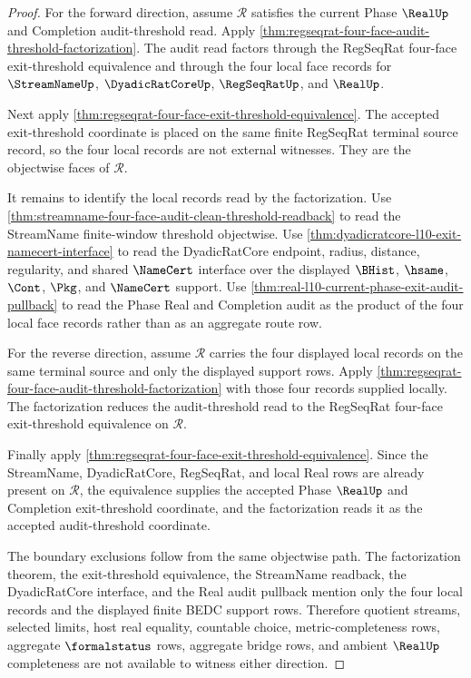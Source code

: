 \begin{proof}
For the forward direction, assume $\mathcal R$ satisfies the current Phase $\RealUp$ and Completion audit-threshold read. Apply \autoref{thm:regseqrat-four-face-audit-threshold-factorization}. The audit read factors through the RegSeqRat four-face exit-threshold equivalence and through the four local face records for $\StreamNameUp$, $\DyadicRatCoreUp$, $\RegSeqRatUp$, and $\RealUp$.

Next apply \autoref{thm:regseqrat-four-face-exit-threshold-equivalence}. The accepted exit-threshold coordinate is placed on the same finite RegSeqRat terminal source record, so the four local records are not external witnesses. They are the objectwise faces of $\mathcal R$.

It remains to identify the local records read by the factorization. Use \autoref{thm:streamname-four-face-audit-clean-threshold-readback} to read the StreamName finite-window threshold objectwise. Use \autoref{thm:dyadicratcore-l10-exit-namecert-interface} to read the DyadicRatCore endpoint, radius, distance, regularity, and shared $\NameCert$ interface over the displayed $\BHist$, $\hsame$, $\Cont$, $\Pkg$, and $\NameCert$ support. Use \autoref{thm:real-l10-current-phase-exit-audit-pullback} to read the Phase Real and Completion audit as the product of the four local face records rather than as an aggregate route row.

For the reverse direction, assume $\mathcal R$ carries the four displayed local records on the same terminal source and only the displayed support rows. Apply \autoref{thm:regseqrat-four-face-audit-threshold-factorization} with those four records supplied locally. The factorization reduces the audit-threshold read to the RegSeqRat four-face exit-threshold equivalence on $\mathcal R$.

Finally apply \autoref{thm:regseqrat-four-face-exit-threshold-equivalence}. Since the StreamName, DyadicRatCore, RegSeqRat, and local Real rows are already present on $\mathcal R$, the equivalence supplies the accepted Phase $\RealUp$ and Completion exit-threshold coordinate, and the factorization reads it as the accepted audit-threshold coordinate.

The boundary exclusions follow from the same objectwise path. The factorization theorem, the exit-threshold equivalence, the StreamName readback, the DyadicRatCore interface, and the Real audit pullback mention only the four local records and the displayed finite BEDC support rows. Therefore quotient streams, selected limits, host real equality, countable choice, metric-completeness rows, aggregate $\formalstatus$ rows, aggregate bridge rows, and ambient $\RealUp$ completeness are not available to witness either direction.
\end{proof}

